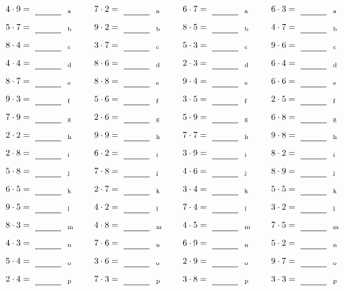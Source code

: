 \documentclass
[
  draft    = true,
  fontsize = 11pt,
  parskip  = half-
]
{scrartcl}
\begin{document}
\par\vfill\par
\begin{align*}
    \pline{4\cdot9}&=\rline{a}
  & \pline{7\cdot2}&=\rline{a}
  & \pline{6\cdot7}&=\rline{a}
  & \pline{6\cdot3}&=\rline{a} \\[1ex]
    \pline{5\cdot7}&=\rline{b}
  & \pline{9\cdot2}&=\rline{b}
  & \pline{8\cdot5}&=\rline{b}
  & \pline{4\cdot7}&=\rline{b} \\[1ex]
    \pline{8\cdot4}&=\rline{c}
  & \pline{3\cdot7}&=\rline{c}
  & \pline{5\cdot3}&=\rline{c}
  & \pline{9\cdot6}&=\rline{c} \\[1ex]
    \pline{4\cdot4}&=\rline{d}
  & \pline{8\cdot6}&=\rline{d}
  & \pline{2\cdot3}&=\rline{d}
  & \pline{6\cdot4}&=\rline{d} \\[1ex]
    \pline{8\cdot7}&=\rline{e}
  & \pline{8\cdot8}&=\rline{e}
  & \pline{9\cdot4}&=\rline{e}
  & \pline{6\cdot6}&=\rline{e} \\[1ex]
    \pline{9\cdot3}&=\rline{f}
  & \pline{5\cdot6}&=\rline{f}
  & \pline{3\cdot5}&=\rline{f}
  & \pline{2\cdot5}&=\rline{f} \\[1ex]
    \pline{7\cdot9}&=\rline{g}
  & \pline{2\cdot6}&=\rline{g}
  & \pline{5\cdot9}&=\rline{g}
  & \pline{6\cdot8}&=\rline{g} \\[1ex]
    \pline{2\cdot2}&=\rline{h}
  & \pline{9\cdot9}&=\rline{h}
  & \pline{7\cdot7}&=\rline{h}
  & \pline{9\cdot8}&=\rline{h} \\[1ex]
    \pline{2\cdot8}&=\rline{i}
  & \pline{6\cdot2}&=\rline{i}
  & \pline{3\cdot9}&=\rline{i}
  & \pline{8\cdot2}&=\rline{i} \\[1ex]
    \pline{5\cdot8}&=\rline{j}
  & \pline{7\cdot8}&=\rline{j}
  & \pline{4\cdot6}&=\rline{j}
  & \pline{8\cdot9}&=\rline{j} \\[1ex]
    \pline{6\cdot5}&=\rline{k}
  & \pline{2\cdot7}&=\rline{k}
  & \pline{3\cdot4}&=\rline{k}
  & \pline{5\cdot5}&=\rline{k} \\[1ex]
    \pline{9\cdot5}&=\rline{l}
  & \pline{4\cdot2}&=\rline{l}
  & \pline{7\cdot4}&=\rline{l}
  & \pline{3\cdot2}&=\rline{l} \\[1ex]
    \pline{8\cdot3}&=\rline{m}
  & \pline{4\cdot8}&=\rline{m}
  & \pline{4\cdot5}&=\rline{m}
  & \pline{7\cdot5}&=\rline{m} \\[1ex]
    \pline{4\cdot3}&=\rline{n}
  & \pline{7\cdot6}&=\rline{n}
  & \pline{6\cdot9}&=\rline{n}
  & \pline{5\cdot2}&=\rline{n} \\[1ex]
    \pline{5\cdot4}&=\rline{o}
  & \pline{3\cdot6}&=\rline{o}
  & \pline{2\cdot9}&=\rline{o}
  & \pline{9\cdot7}&=\rline{o} \\[1ex]
    \pline{2\cdot4}&=\rline{p}
  & \pline{7\cdot3}&=\rline{p}
  & \pline{3\cdot8}&=\rline{p}
  & \pline{3\cdot3}&=\rline{p}
\end{align*}
\end{document}
